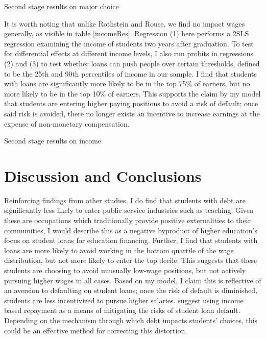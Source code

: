 \documentclass{article}
\newcommand{\regs}{../Analysis/Regressions/Output/}
\begin{document}
	\begin{table}
		\centering
		\caption{Second stage results on major choice}		
		
		\label{majChoice}
	\end{table}
	
	It is worth noting that unlike Rothstein and Rouse, we find no impact wages generally, as visible in table \ref{incomeRes}. Regression (1) here performs a 2SLS regression examining the income of students two years after graduation. To test for differential effects at different income levels, I also run probits in regressions (2) and (3) to test whether loans can push people over certain thresholds, defined to be the 25th and 90th percentiles of income in our sample. I find that students with loans are significantly more likely to be in the top 75\% of earners, but no more likely to be in the top 10\% of earners. This supports the claim by my model that students are entering higher paying positions to avoid a risk of default; once said risk is avoided, there no longer exists an incentive to increase earnings at the expense of non-monetary compensation. 
	
	\begin{table}
		\centering
		\caption{Second stage results on income}		
		
		\label{incomeRes}
	\end{table}
	
	\section{Discussion and Conclusions}
	
	Reinforcing findings from other studies, I do find that students with debt are significantly less likely to enter public service industries such as teaching. Given these are occupations which traditionally provide positive externalities to their communities, I would describe this as a negative byproduct of higher education's focus on student loans for education financing. Further, I find that students with loans are more likely to avoid working in the bottom quartile of the wage distribution, but not more likely to enter the top decile. This suggests that these students are choosing to avoid unusually low-wage positions, but not actively pursuing higher wages in all cases. Based on my model, I claim this is reflective of an aversion to defaulting on student loans; once the risk of default is diminished, students are less incentivized to pursue higher salaries. \textcite{abraham2018} suggest using income based repayment as a means of mitigating the risks of student loan default. Depending on the mechanism through which debt impacts students' choices, this could be an effective method for correcting this distortion.
	
\end{document}
